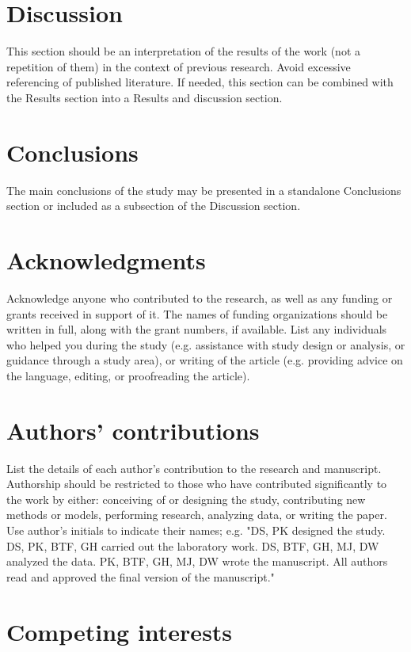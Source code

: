 \documentclass[10pt,twocolumn,twoside]{base/ijb}
\begin{document}
\section{Discussion}

This section should be an interpretation of the results of the work (not a repetition of them) in the context of previous research. Avoid excessive referencing of published literature. If needed, this section can be combined with the Results section into a Results and discussion section.

\section{Conclusions}

The main conclusions of the study may be presented in a standalone Conclusions section or included as a subsection of the Discussion section.

\section*{Acknowledgments}

Acknowledge anyone who contributed to the research, as well as any funding or grants received in support of it. The names of funding organizations should be written in full, along with the grant numbers, if available. List any individuals who helped you during the study (e.g. assistance with study design or analysis, or guidance through a study area), or writing of the article (e.g. providing advice on the language, editing, or proofreading the article).

\section*{Authors’ contributions}

List the details of each author’s contribution to the research and manuscript. Authorship should be restricted to those who have contributed significantly to the work by either: conceiving of or designing the study, contributing new methods or models, performing research, analyzing data, or writing the paper. Use author’s initials to indicate their names; e.g. "DS, PK designed the study. DS, PK, BTF, GH carried out the laboratory work. DS, BTF, GH, MJ, DW analyzed the data. PK, BTF, GH, MJ, DW wrote the manuscript. All authors read and approved the final version of the manuscript."

\section*{Competing interests}
\end{document}
